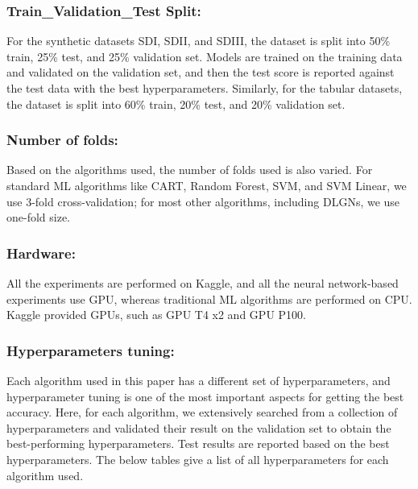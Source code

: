 \documentclass{article} %
\renewcommand{\>}{{\rightarrow}}
\renewcommand{\=}{\stackrel{\triangle}{=}}
\newcommand{\0}{{\mathbf 0}}
\begin{document}

\subsubsection{Train\_Validation\_Test Split:} For the synthetic datasets SDI, SDII, and SDIII, the dataset is split into 50\% train, 25\% test, and 25\% validation set. Models are trained on the training data and validated on the validation set, and then the test score is reported against the test data with the best hyperparameters. Similarly, for the tabular datasets, the dataset is split into 60\% train, 20\% test, and 20\% validation set.
\subsubsection{Number of folds:} Based on the algorithms used, the number of folds used is also varied. For standard ML algorithms like CART, Random Forest, SVM, and SVM Linear, we use 3-fold cross-validation; for most other algorithms, including DLGNs, we use one-fold size.
\subsubsection{Hardware:} All the experiments are performed on Kaggle, and all the neural network-based experiments use GPU, whereas traditional ML algorithms are performed on CPU. Kaggle provided GPUs, such as GPU T4 x2 and GPU P100.
\subsubsection{Hyperparameters tuning:} Each algorithm used in this paper has a different set of hyperparameters, and hyperparameter tuning is one of the most important aspects for getting the best accuracy. Here, for each algorithm, we extensively searched from a collection of hyperparameters and validated their result on the validation set to obtain the best-performing hyperparameters. Test results are reported based on the best hyperparameters. The below tables give a list of all hyperparameters for each algorithm used. 
\end{document}
